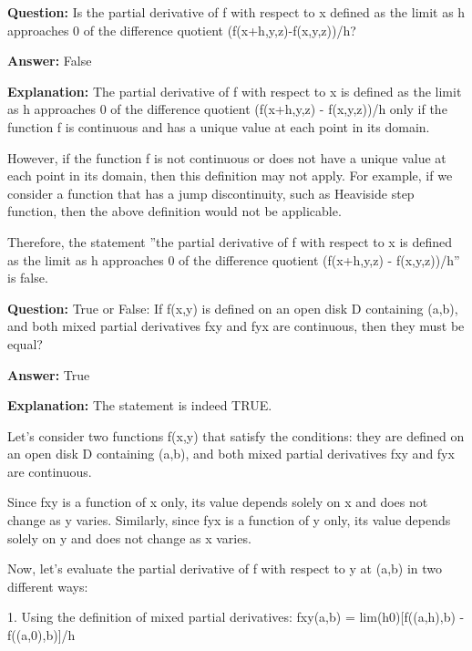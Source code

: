 \documentclass{article}
\begin{document}
                \vspace{0.5cm} 
        
            
                \textbf {Question:} Is the partial derivative of f with respect to x defined as the limit as h approaches 0 of the difference quotient (f(x+h,y,z)-f(x,y,z))/h?
                
                \textbf{Answer:} False

                \textbf{Explanation:} The partial derivative of f with respect to x is defined as the limit as h approaches 0 of the difference quotient (f(x+h,y,z) - f(x,y,z))/h only if the function f is continuous and has a unique value at each point in its domain.

However, if the function f is not continuous or does not have a unique value at each point in its domain, then this definition may not apply. For example, if we consider a function that has a jump discontinuity, such as Heaviside step function, then the above definition would not be applicable.

Therefore, the statement ''the partial derivative of f with respect to x is defined as the limit as h approaches 0 of the difference quotient (f(x+h,y,z) - f(x,y,z))/h'' is false.
                
                \vspace{0.5cm} 
        
            
                \textbf {Question:} True or False: If f(x,y) is defined on an open disk D containing (a,b), and both mixed partial derivatives fxy and fyx are continuous, then they must be equal?
                
                \textbf{Answer:} True

                \textbf{Explanation:} The statement is indeed TRUE.

Let's consider two functions f(x,y) that satisfy the conditions: they are defined on an open disk D containing (a,b), and both mixed partial derivatives fxy and fyx are continuous. 

Since fxy is a function of x only, its value depends solely on x and does not change as y varies. Similarly, since fyx is a function of y only, its value depends solely on y and does not change as x varies.

Now, let's evaluate the partial derivative of f with respect to y at (a,b) in two different ways:

1. Using the definition of mixed partial derivatives: 
fxy(a,b) = lim(h{\textrightarrow}0)[f((a,h),b) - f((a,0),b)]/h
\end{document}

